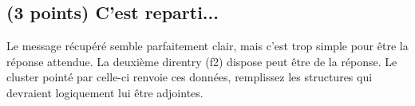 \documentclass[11pt,a4paper]{article}
\begin{document}
\subsection{(3 points) C'est reparti... }

Le message récupéré semble parfaitement clair, mais c'est trop simple pour être la réponse attendue.
La deuxième direntry (f2) dispose peut être de la réponse.
Le cluster pointé par celle-ci renvoie ces données, remplissez les structures qui devraient logiquement lui être adjointes.

\bigskip

\begin{table}[ht!]
  \centering
  \hspace*{-1.1cm}
  \begin{minipage}{0.37\textwidth}
    \centering



\end{minipage}
\end{table}
\end{document}
